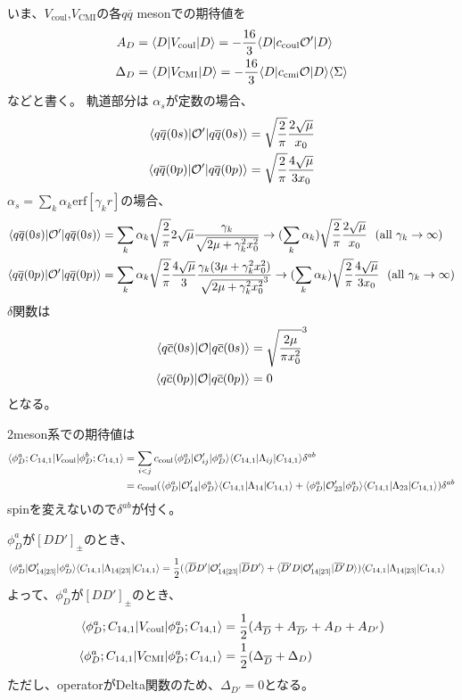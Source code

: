 \documentclass[a4j]{jarticle}
\def\bra{\langle}
\def\ket{\rangle}
\def\calO{{\cal O}}
\def\cbar{\overline{{c}}}
\def\qbar{\overline{{q}}}
\def\Dbar{\overline{{D}}{}}
\def\half#1{\text{${#1\over 2}$}}
\def\Vcoul{V_\text{coul}}
\def\Vcmi{V_\text{CMI}}
\begin{document}
いま、$\Vcoul$,$\Vcmi$の各$q\qbar$ mesonでの期待値を
\begin{align}
A_{D}&=\bra D|\Vcoul|D\ket=-{16\over 3}\bra D|c_\text{coul}\calO'|D\ket
\\
\Delta_{D}&=\bra D|\Vcmi|D\ket=-{16\over 3}\bra D|c_\text{cmi}\calO|D\ket\bra\Sigma\ket
\end{align}
などと書く。
軌道部分は $\alpha_s$が定数の場合、
\begin{align}
\bra q\qbar (0s)|\calO'|q\qbar (0s) \ket&= \sqrt{2\over \pi}{2\sqrt{\mu}\over x_0}
\\
\bra q\qbar (0p)|\calO'|q\qbar (0p) \ket&=\sqrt{2\over \pi}{4\sqrt{\mu}\over 3x_0}
\end{align}
$\alpha_s=\sum_k\alpha_k\text{erf}[\gamma_k r]$の場合、
\begin{align}
\bra q\qbar (0s)|\calO'|q\qbar (0s) \ket&= 
\sum_k\alpha_k \sqrt{2\over \pi} 2\sqrt{\mu}
{\gamma_k\over \sqrt{2\mu +\gamma_k^2 x_0^2}}
\rightarrow (\sum_k\alpha_k)\sqrt{2\over \pi}{2\sqrt{\mu}\over x_0}~~(\text{all } \gamma_k\rightarrow\infty)
\\
\bra q\qbar (0p)|\calO'|q\qbar (0p) \ket&
=\sum_k\alpha_k\sqrt{2\over \pi}{4\sqrt{\mu}\over 3}
{\gamma_k(3\mu +\gamma_k^2 x_0^2)\over \sqrt{2\mu +\gamma_k^2 x_0^2}^3}
\rightarrow (\sum_k\alpha_k)\sqrt{2\over \pi}{4\sqrt{\mu}\over 3x_0}~~(\text{all } \gamma_k\rightarrow\infty)
\end{align}
$\delta$関数は
\begin{align}
\bra q\cbar (0s)|\calO|q\cbar (0s) \ket&=\sqrt{2\mu\over \pi x_0^2}^{3}
\\
\bra q\cbar (0p)|\calO|q\cbar (0p) \ket&=0
\end{align}
となる。

2meson系での期待値は
\begin{align}
\bra \phi_D^a;C_{14,1}|\Vcoul|\phi_D^b;C_{14,1}\ket
&=\sum_{i<j}c_\text{coul}\bra \phi_D^a|\calO'_{ij}|\phi_D^a\ket\bra C_{14,1}|\Lambda_{ij}|C_{14,1}\ket \delta^{ab}
\\
&=c_\text{coul}(\bra \phi_D^a|\calO'_{14}|\phi_D^a\ket\bra C_{14,1}|\Lambda_{14}|C_{14,1}\ket
 +\bra \phi_D^a|\calO'_{23}|\phi_D^a\ket\bra C_{14,1}|\Lambda_{23}|C_{14,1}\ket)\delta^{ab}
\end{align}
spinを変えないので$\delta^{ab}$が付く。

$\phi_D^a$が$[DD']_\pm$のとき、
\begin{align}
\bra \phi_D^a|\calO'_{14[23]}|\phi_D^a\ket\bra C_{14,1}|\Lambda_{14[23]}|C_{14,1}\ket
&=\half1
(\bra \Dbar D'|\calO'_{14[23]}|\Dbar D'\ket+\bra \Dbar' D|\calO'_{14[23]}|\Dbar' D\ket)
\bra C_{14,1}|\Lambda_{14[23]}|C_{14,1}\ket
\end{align}
よって、$\phi_D^a$が$[DD']_\pm$のとき、
\begin{align}
\bra \phi_D^a;C_{14,1}|\Vcoul|\phi_D^a;C_{14,1}\ket
&=\half1 (A_{\Dbar}+A_{\Dbar'}+A_D+A_{D'})
\\
\bra \phi_D^a;C_{14,1}|\Vcmi|\phi_D^a;C_{14,1}\ket
&=\half1 (\Delta_{\Dbar}+\Delta_D)
\end{align}
ただし、operatorがDelta関数のため、$\Delta_{D'}=0$となる。
\end{document}
